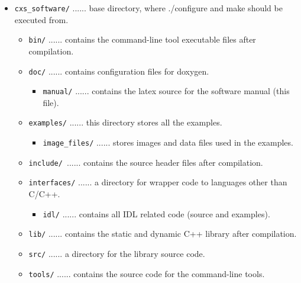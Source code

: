 \documentclass[]{cxs-software}
\begin{document}
\begin{itemize}
   \item[] {\tt cxs\_software/} ...... base directory, where ./configure and make should be executed from.
   \begin{itemize}
      \item[] {\tt bin/} ...... contains the command-line tool executable files after compilation.
      \item[] {\tt doc/} ...... contains configuration files for doxygen.
      \begin{itemize}
         \item[] {\tt manual/} ...... contains the latex source for the software manual (this file).
      \end{itemize}
      \item[] {\tt examples/} ...... this directory stores all the examples.
      \begin{itemize}
         \item[] {\tt image\_files/} ...... stores images and data files used in the examples.
      \end{itemize}
      \item[] {\tt include/ }...... contains the source header files after compilation.
      \item[] {\tt interfaces/} ...... a directory for wrapper code to languages other than C/C++.
      \begin{itemize}
         \item[] {\tt idl/} ...... contains all IDL related code (source and examples).
      \end{itemize}
      \item[] {\tt lib/} ...... contains the static and dynamic C++ library after compilation.
      \item[] {\tt src/} ...... a directory for the library source code.
      \item[] {\tt tools/} ...... contains the source code for the command-line tools.
   \end{itemize}
\end{itemize}


\end{document}
